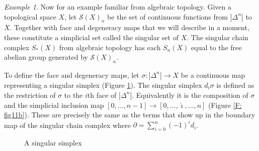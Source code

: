 \documentclass[12pt]{article}
\theoremstyle{plain}
\theoremstyle{definition}
\theoremstyle{remark}
\newtheorem{example}[theorem]{Example}
\newcommand{\bd}{\partial}
\newcommand{\ms}[1]{\mathscr{#1}}
\begin{document}
\begin{example}\label{E: singular}
Now for an example familiar from algebraic topology. Given a topological space $X$, let  $\ms S(X)_n$ be the set of continuous functions from $|\Delta^n|$  to $X$. Together with face and degeneracy maps that we will describe in a moment, these constitute a simplicial set called the singular set of $X$. The singular chain complex $S_*(X)$  from algebraic topology has each $S_n(X)$ equal to the free abelian group generated by $\ms S(X)_n$. 

To define the face and degeneracy maps,  let $\sigma\colon|\Delta^n|\to X$ be a continuous map representing a singular simplex (Figure \ref{F: fig11a}). The singular simplex $d_i\sigma$ is defined as the  restriction of  $\sigma$ to the $i$th face of $|\Delta^n|$. Equivalently it is the composition of $\sigma$ and the simplicial inclusion map $[0,\ldots, n-1]\to [0,\ldots, \hat \imath,\ldots, n]$ (Figure \ref{F: fig11b}). These are precisely the same as the terms that show up in the boundary map of the singular chain  complex where $\bd=\sum_{i=0}^n(-1)^id_i$. 
\begin{figure}[!htp]
\begin{center}
\end{center}
\caption{A singular simplex}\label{F: fig11a}
\end{figure}



\end{example}
\end{document}
